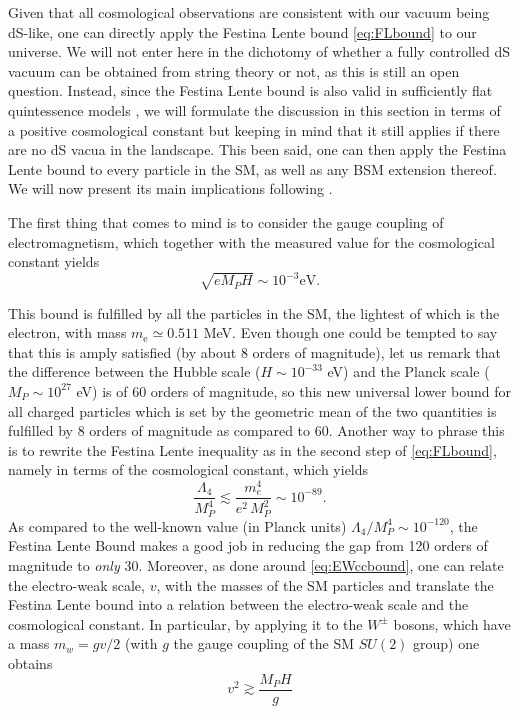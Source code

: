 \documentclass[11pt,a4paper]{article}
\begin{document}
Given that all cosmological observations are consistent with our vacuum being dS-like, one can directly apply the Festina Lente bound \eqref{eq:FLbound} to our universe. We will not enter here in the dichotomy of whether a fully controlled dS vacuum can be obtained from string theory or not, as this is still an open question. Instead, since the Festina Lente bound is also valid in sufficiently flat quintessence models \cite{Montero:2021otb}, we will formulate the discussion in this section in terms of a positive cosmological constant but keeping in mind that it still applies if there are no dS vacua in the landscape. This been said, one can then apply the Festina Lente bound to every particle in the SM, as well as any BSM extension thereof. We will now present its main implications following \cite{Montero:2019ekk,Montero:2021otb}.

The first thing that comes to mind is to consider the gauge coupling of electromagnetism, which together with the measured value for the cosmological constant yields 
\begin{equation}
\sqrt{e M_{P} H} \sim 10^{-3} \mathrm{eV}.
\end{equation}

This bound is fulfilled by all the particles in the SM, the lightest of which is the electron, with mass $m_\mathrm{e}\simeq 0.511$ MeV. Even though one could be tempted to say that this is amply satisfied (by about 8 orders of magnitude), let us remark that the difference between the Hubble scale ($H\sim 10^{-33}$ eV) and the Planck scale ($M_P\sim 10^{27}$ eV) is of 60 orders of magnitude, so this new universal lower bound for all charged particles which is set by the geometric mean of the two quantities is fulfilled by 8 orders of magnitude as compared to 60. 
Another way to phrase this is to rewrite the Festina Lente inequality as in the second step of \eqref{eq:FLbound}, namely in terms of the cosmological constant, which yields
\begin{equation}
\dfrac{\Lambda_4}{M_P^4} \lesssim \dfrac{m_e^4}{e^2\, M_P^2}\sim 10^{-89}.
\end{equation}
As compared to the well-known value (in Planck units) $\Lambda_4/M_P^4 \sim  10^{-120}$, the Festina Lente Bound makes a good job in reducing the gap from 120 orders of magnitude to  \emph{only} 30. Moreover, as done around \eqref{eq:EWccbound}, one can relate the electro-weak scale, $v$, with the masses of the SM particles and translate the Festina Lente bound into a relation between the electro-weak scale and the cosmological constant. In particular, by applying it to the $W^{\pm}$ bosons, which have a mass $m_w=gv/2$ (with $g$ the gauge coupling of the SM $SU(2)$ group) one obtains
\begin{equation}
v^{2} \gtrsim \dfrac{ M_{P} H}{g}
\end{equation}
\end{document}
